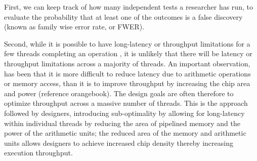 \documentclass[10pt]{article}[draft]
\begin{document}
		  First, we can keep track of how many independent tests a researcher has run, to evaluate the probability that at least one of the outcomes is a false discovery (known as family wise error rate, or FWER). 
		  
		  
		  
		  Second, while it is possible to have long-latency or throughput limitations for a few threads completing an operation , it is unlikely that there will be latency or throughput limitations across a majority of threads. An important observation, has been that it is more difficult to reduce latency due to arithmetic operations or memory access, than it is to improve throughput by increasing the chip area and power (reference orangebook). The design goals are often therefore to optimize throughput across a massive number of threads. This is the approach followed by designers, introducing sub-optimality by allowing for long-latency within individual threads by reducing the area of pipelined memory and the power of the arithmetic units; the reduced area of the memory and arithmetic units allows designers to achieve increased chip density thereby increasing execution throughput. 
		  
\end{document}
